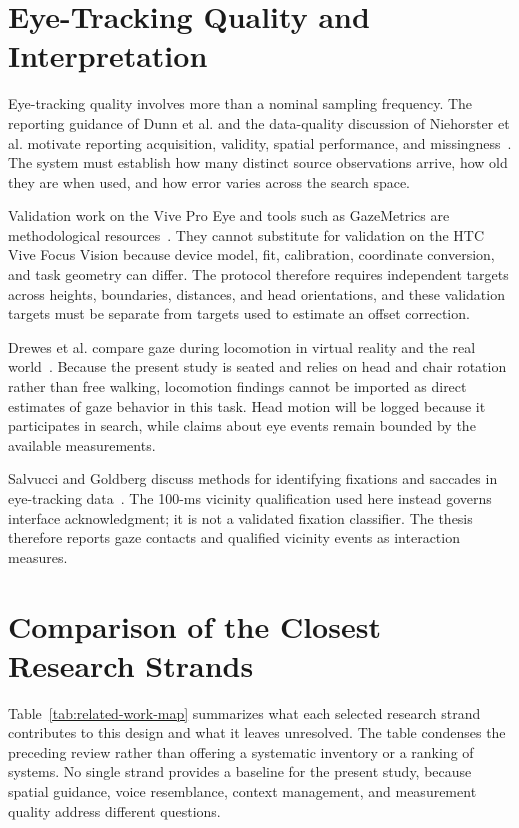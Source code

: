\section{Eye-Tracking Quality and Interpretation}
Eye-tracking quality involves more than a nominal sampling frequency. The reporting guidance of Dunn et al. and the data-quality discussion of Niehorster et al. motivate reporting acquisition, validity, spatial performance, and missingness~\cite{dunn2024reporting,niehorster2026dataquality}. The system must establish how many distinct source observations arrive, how old they are when used, and how error varies across the search space.

Validation work on the Vive Pro Eye and tools such as GazeMetrics are methodological resources~\cite{schuetz2022vive,sipatchin2021usability,adhanom2020gazemetrics}. They cannot substitute for validation on the HTC Vive Focus Vision because device model, fit, calibration, coordinate conversion, and task geometry can differ. The protocol therefore requires independent targets across heights, boundaries, distances, and head orientations, and these validation targets must be separate from targets used to estimate an offset correction.

Drewes et al. compare gaze during locomotion in virtual reality and the real world~\cite{drewes2021locomotion}. Because the present study is seated and relies on head and chair rotation rather than free walking, locomotion findings cannot be imported as direct estimates of gaze behavior in this task. Head motion will be logged because it participates in search, while claims about eye events remain bounded by the available measurements.

Salvucci and Goldberg discuss methods for identifying fixations and saccades in eye-tracking data~\cite{salvucci2000fixations}. The 100-ms vicinity qualification used here instead governs interface acknowledgment; it is not a validated fixation classifier. The thesis therefore reports gaze contacts and qualified vicinity events as interaction measures.

\section{Comparison of the Closest Research Strands}
Table~\ref{tab:related-work-map} summarizes what each selected research strand contributes to this design and what it leaves unresolved. The table condenses the preceding review rather than offering a systematic inventory or a ranking of systems. No single strand provides a baseline for the present study, because spatial guidance, voice resemblance, context management, and measurement quality address different questions.

